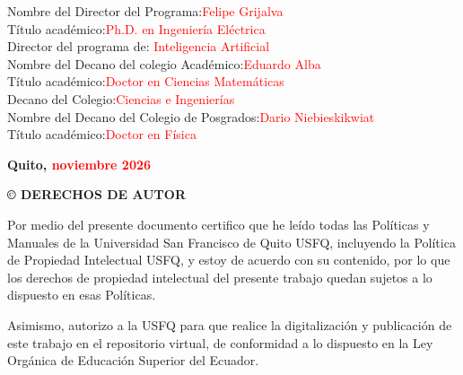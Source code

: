 \documentclass[journal]{IEEEtran}
\newenvironment{customfontsize}{
    \fontsize{12}{14}\selectfont
}{}
\begin{document}
\begin{customfontsize}
Nombre del Director del Programa:\hspace{3cm}\textcolor{red} {Felipe Grijalva}\\
Título académico:\hspace{6.2cm}\textcolor{red}{Ph.D. en Ingeniería Eléctrica}\\
Director del programa de:\hspace{4.7cm}\textcolor{red}{ Inteligencia Artificial}
\vspace{30pt}
\\Nombre del Decano del colegio Académico:\hspace{1.6cm}\textcolor{red}{Eduardo Alba}\\ 
Título académico:\hspace{6.2cm}\textcolor{red}{Doctor en Ciencias Matemáticas}\\
Decano del Colegio:\hspace{5.8cm}\textcolor{red}{Ciencias e Ingenierías}
\vspace{30pt}
\\Nombre del Decano del Colegio de Posgrados:\hspace{1cm}\textcolor{red}{Dario Niebieskikwiat}\\
Título académico:\hspace{6.1cm}\textcolor{red}{Doctor en Física}

\end{customfontsize}

\begin{center}
\vspace{350pt}
\textbf{\fontsize{14}{16}\selectfont Quito, \textcolor{red}{noviembre 2026}}
\end{center}

\newpage
\begin{center}
\textbf{\fontsize{14}{16}\selectfont © DERECHOS DE AUTOR}\\
\vspace{10pt}
\end{center}

\fontsize{12}{14}\selectfont
{
\setlength{\parindent}{3em}
\hspace{1pt}

Por medio del presente documento certifico que he leído todas las Políticas y Manuales de la Universidad San Francisco de Quito USFQ, incluyendo la Política de Propiedad Intelectual USFQ, y estoy de acuerdo con su contenido, por lo que los derechos de propiedad intelectual del presente trabajo quedan sujetos a lo dispuesto en esas Políticas.

Asimismo, autorizo a la USFQ para que realice la digitalización y publicación de este trabajo en el repositorio virtual, de conformidad a lo dispuesto en la Ley Orgánica de Educación Superior del Ecuador.
}
\end{document}
